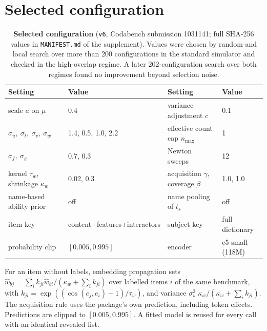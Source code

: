\documentclass{article}
\begin{document}



\appendix
\section{Selected configuration}\label{app:hp}
\begin{table}[H]
  \caption{\textbf{Selected configuration} (\texttt{v6}, Codabench submission 1031141; full SHA-256 values in \texttt{MANIFEST.md} of the supplement). Values were chosen by random and local search over more than 200 configurations in the standard simulator and checked in the high-overlap regime. A later 202-configuration search over both regimes found no improvement beyond selection noise.}
  \label{tab:hp}
  \centering\footnotesize
  \begin{tabular}{@{}llll@{}}
    \toprule
    Setting & Value & Setting & Value \\
    \midrule
    scale $a$ on $\mu$ & 0.4 & variance adjustment $c$ & 0.1 \\
    $\sigma_u,\ \sigma_t,\ \sigma_v,\ \sigma_w$ & 1.4, 0.5, 1.0, 2.2 & effective count cap $n_{\max}$ & 1 \\
    $\sigma_f,\ \sigma_g$ & 0.7, 0.3 & Newton sweeps & 12 \\
    kernel $\tau_w$, shrinkage $\kappa_w$ & 0.02, 0.3 & acquisition $\gamma$, coverage $\beta$ & 1.0, 1.0 \\
    name-based ability prior & off & name pooling of $t_s$ & off \\
    item key & content+features+interactors & subject key & full dictionary \\
    probability clip & $[0.005, 0.995]$ & encoder & e5-small (118M) \\
    \bottomrule
  \end{tabular}
\end{table}
For an item without labels, embedding propagation sets $\hat w_{bj} = \sum_i k_{ji}\hat w_{bi}/(\kappa_w+\sum_i k_{ji})$ over labelled items $i$ of the same benchmark, with $k_{ji}=\exp((\cos(e_j,e_i)-1)/\tau_w)$, and variance $\sigma_w^2\,\kappa_w/(\kappa_w+\sum_i k_{ji})$. The acquisition rule uses the package's own prediction, including token effects. Predictions are clipped to $[0.005, 0.995]$. A fitted model is reused for every call with an identical revealed list.
\end{document}
